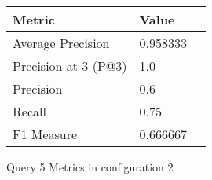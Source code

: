 \begin{figure}[H]
\begin{center}
\begin{tabular}{lll}
\toprule
{}                      Metric &         Value \\
\midrule
     Average Precision &  0.958333 \\
  Precision at 3 (P@3) &       1.0 \\
             Precision &       0.6 \\
                Recall &      0.75 \\
            F1 Measure &  0.666667 \\
\bottomrule
\end{tabular}
\end{center}
\caption{Query 5 Metrics in configuration 2}
\label{fig:query_5_metrics_config_2}
\end{figure}